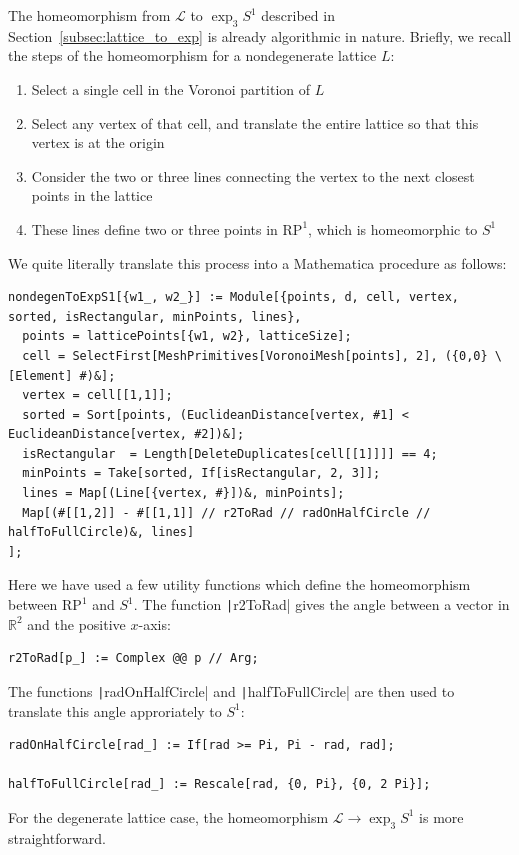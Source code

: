 \documentclass[12pt,twoside]{reedthesis}
\theoremstyle{definition}
\newcommand{\R}{\mathbb{R}}
\newcommand{\LS}{\mathcal{L}}
\begin{document}
The homeomorphism from $\LS$ to $\exp_3 S^1$ described in Section~\ref{subsec:lattice_to_exp} is already algorithmic in nature.
Briefly, we recall the steps of the homeomorphism for a nondegenerate lattice $L$:
\begin{enumerate}
  \item Select a single cell in the Voronoi partition of $L$
  \item Select any vertex of that cell, and translate the entire lattice so that this vertex is at the origin
  \item Consider the two or three lines connecting the vertex to the next closest points in the lattice
  \item These lines define two or three points in $\mathrm{RP}^1$, which is homeomorphic to $S^1$
\end{enumerate}
We quite literally translate this process into a Mathematica procedure as follows:
\begin{verbatim}
nondegenToExpS1[{w1_, w2_}] := Module[{points, d, cell, vertex, sorted, isRectangular, minPoints, lines},
  points = latticePoints[{w1, w2}, latticeSize];
  cell = SelectFirst[MeshPrimitives[VoronoiMesh[points], 2], ({0,0} \[Element] #)&];
  vertex = cell[[1,1]];
  sorted = Sort[points, (EuclideanDistance[vertex, #1] < EuclideanDistance[vertex, #2])&];
  isRectangular  = Length[DeleteDuplicates[cell[[1]]]] == 4;
  minPoints = Take[sorted, If[isRectangular, 2, 3]];
  lines = Map[(Line[{vertex, #}])&, minPoints];
  Map[(#[[1,2]] - #[[1,1]] // r2ToRad // radOnHalfCircle // halfToFullCircle)&, lines]
];
\end{verbatim}
Here we have used a few utility functions which define the homeomorphism between $\mathrm{RP}^1$ and $S^1$.
The function \texttt|r2ToRad| gives the angle between a vector in $\R^2$ and the positive $x$-axis:
\begin{verbatim}
r2ToRad[p_] := Complex @@ p // Arg;
\end{verbatim}
The functions \texttt|radOnHalfCircle| and \texttt|halfToFullCircle| are then used to translate this angle approriately to $S^1$:
\begin{verbatim}
radOnHalfCircle[rad_] := If[rad >= Pi, Pi - rad, rad];

halfToFullCircle[rad_] := Rescale[rad, {0, Pi}, {0, 2 Pi}];
\end{verbatim}
For the degenerate lattice case, the homeomorphism $\LS \to \exp_3 S^1$ is more straightforward.
\end{document}
